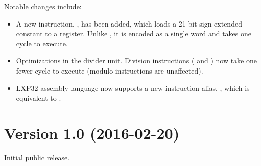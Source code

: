 \documentclass[a4paper,12pt,twoside,extrafontsizes]{memoir}
\begin{document}
Notable changes include:

\begin{itemize}
	\item A new instruction, , has been added, which loads a 21-bit sign extended constant to a register. Unlike , it is encoded as a single word and takes one cycle to execute.
	\item Optimizations in the divider unit. Division instructions ( and ) now take one fewer cycle to execute (modulo instructions are unaffected).
	\item LXP32 assembly language now supports a new instruction alias, , which is equivalent to .
\end{itemize}

\section*{Version 1.0 (2016-02-20)}

Initial public release.
\end{document}
